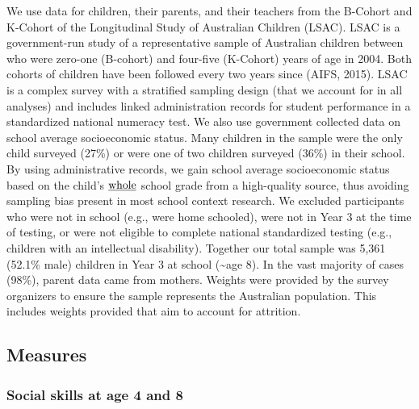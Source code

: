 \documentclass[
  english,
  man]{apa6}
\begin{document}
We use data for children, their parents, and their teachers from the B-Cohort and K-Cohort of the Longitudinal Study of Australian Children (LSAC). LSAC is a government-run study of a representative sample of Australian children between who were zero-one (B-cohort) and four-five (K-Cohort) years of age in 2004. Both cohorts of children have been followed every two years since (AIFS, 2015). LSAC is a complex survey with a stratified sampling design (that we account for in all analyses) and includes linked administration records for student performance in a standardized national numeracy test. We also use government collected data on school average socioeconomic status. Many children in the sample were the only child surveyed (27\%) or were one of two children surveyed (36\%) in their school. By using administrative records, we gain school average socioeconomic status based on the child's \(\text{\underline{whole}}\) school grade from a high-quality source, thus avoiding sampling bias present in most school context research. We excluded participants who were not in school (e.g., were home schooled), were not in Year 3 at the time of testing, or were not eligible to complete national standardized testing (e.g., children with an intellectual disability). Together our total sample was 5,361 (52.1\% male) children in Year 3 at school (\textasciitilde age 8). In the vast majority of cases (98\%), parent data came from mothers. Weights were provided by the survey organizers to ensure the sample represents the Australian population. This includes weights provided that aim to account for attrition.

\hypertarget{measures}{%
\subsection{Measures}\label{measures}}

\hypertarget{social-skills-at-age-4-and-8}{%
\subsubsection{Social skills at age 4 and 8}\label{social-skills-at-age-4-and-8}}
\end{document}
